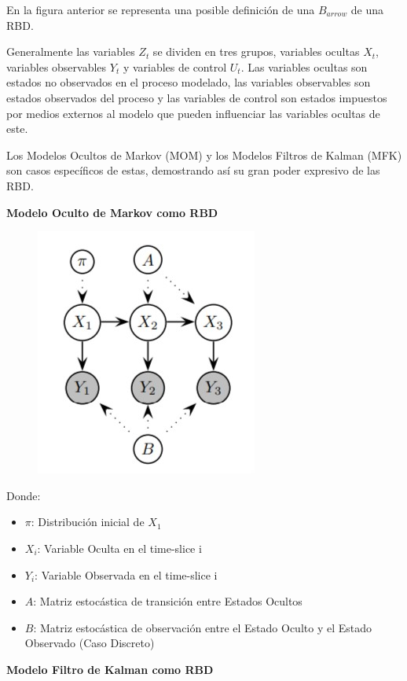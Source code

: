 \documentclass[]{article}
\begin{document}
En la figura anterior se representa una posible definición de una
$B_{arrow}$ de una RBD.

Generalmente las variables $Z_t$ se dividen en tres grupos,
variables ocultas $X_t$, variables observables $Y_t$ y variables de
control $U_t$. Las variables ocultas son estados no observados en el
proceso modelado, las variables observables son estados observados del
proceso y las variables de control son estados impuestos por medios
externos al modelo que pueden influenciar las variables ocultas de este.

Los Modelos Ocultos de Markov (MOM) y los Modelos Filtros de Kalman
(MFK) son casos específicos de estas, demostrando así su gran poder
expresivo de las RBD.

\textbf{Modelo Oculto de Markov como RBD}

\begin{figure}
\centering
\includegraphics{images/HMMasDBN.jpg}
\caption{}
\end{figure}

Donde:

\begin{itemize}
\item
  $\pi$: Distribución inicial de $X_1$
\item
  $X_i$: Variable Oculta en el time-slice i
\item
  $Y_i$: Variable Observada en el time-slice i
\item
  $A$: Matriz estocástica de transición entre Estados Ocultos
\item
  $B$: Matriz estocástica de observación entre el Estado Oculto y el
  Estado Observado (Caso Discreto)
\end{itemize}

\textbf{Modelo Filtro de Kalman como RBD}
\end{document}
